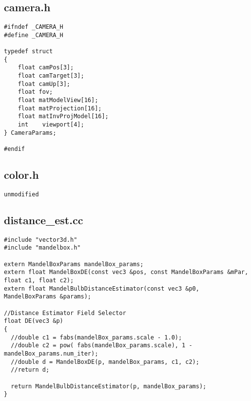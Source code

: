 \documentclass[]{article}
\begin{document}
\subsection{camera.h}
\begin{Verbatim}[fontsize= \footnotesize, tabsize=4]
#ifndef _CAMERA_H
#define _CAMERA_H

typedef struct
{
	float camPos[3];
	float camTarget[3];
	float camUp[3];
	float fov;
	float matModelView[16];
	float matProjection[16];
	float matInvProjModel[16]; 
	int    viewport[4];
} CameraParams;

#endif
\end{Verbatim}

\subsection{color.h}
\begin{Verbatim}[fontsize= \footnotesize, tabsize=4]
unmodified
\end{Verbatim}

\subsection{distance\_est.cc}
\begin{Verbatim}[fontsize= \footnotesize, tabsize=4]
#include "vector3d.h"
#include "mandelbox.h"

extern MandelBoxParams mandelBox_params;
extern float MandelBoxDE(const vec3 &pos, const MandelBoxParams &mPar, float c1, float c2);
extern float MandelBulbDistanceEstimator(const vec3 &p0, MandelBoxParams &params);

//Distance Estimator Field Selector
float DE(vec3 &p)
{
  //double c1 = fabs(mandelBox_params.scale - 1.0);
  //double c2 = pow( fabs(mandelBox_params.scale), 1 - mandelBox_params.num_iter);
  //double d = MandelBoxDE(p, mandelBox_params, c1, c2);
  //return d;

  return MandelBulbDistanceEstimator(p, mandelBox_params);
}
\end{Verbatim}
\end{document}
